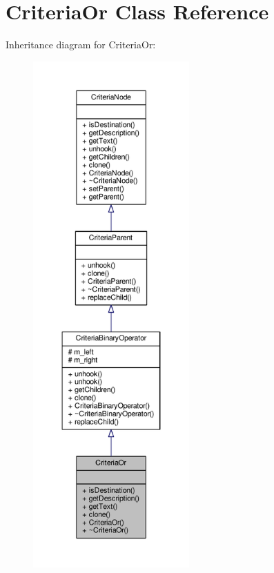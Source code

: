 \hypertarget{classCriteriaOr}{}\section{Criteria\+Or Class Reference}
\label{classCriteriaOr}


Inheritance diagram for Criteria\+Or\+:
\nopagebreak
\begin{figure}[H]
\begin{center}
\leavevmode
\includegraphics[height=550pt]{d3/d89/classCriteriaOr__inherit__graph}
\end{center}
\end{figure}


